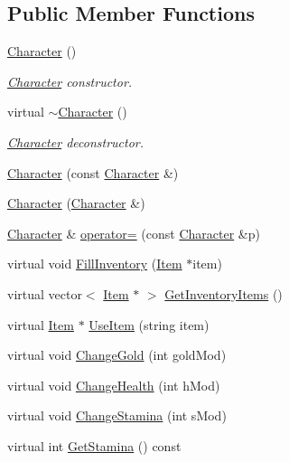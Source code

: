 \subsection*{Public Member Functions}
\begin{DoxyCompactItemize}
\item 
\hyperlink{classCharacter_adc27bdd255876169bad2ed0bae0cffb5}{Character} ()
\begin{DoxyCompactList}\small\item\em \hyperlink{classCharacter}{Character} constructor. \end{DoxyCompactList}\item 
virtual \hyperlink{classCharacter_af3ec409c562122c4464e8a9d3be5f6d2}{$\sim$\-Character} ()
\begin{DoxyCompactList}\small\item\em \hyperlink{classCharacter}{Character} deconstructor. \end{DoxyCompactList}\item 
\hyperlink{classCharacter_a40d65bfcf0422cebc44b2e9b01d8fa2b}{Character} (const \hyperlink{classCharacter}{Character} \&)
\item 
\hyperlink{classCharacter_a01a01e1feb04b92658d35e946ae155bb}{Character} (\hyperlink{classCharacter}{Character} \&)
\item 
\hyperlink{classCharacter}{Character} \& \hyperlink{classCharacter_aa441f0489c055e79c8dfdd813a20c3ad}{operator=} (const \hyperlink{classCharacter}{Character} \&p)
\item 
virtual void \hyperlink{classCharacter_a546635f47f379e4eed59d85d31d85c86}{Fill\-Inventory} (\hyperlink{classItem}{Item} $\ast$item)
\item 
virtual vector$<$ \hyperlink{classItem}{Item} $\ast$ $>$ \hyperlink{classCharacter_a21e35b07fd2bddd94de754f5b8027fcc}{Get\-Inventory\-Items} ()
\item 
virtual \hyperlink{classItem}{Item} $\ast$ \hyperlink{classCharacter_ad13bd70e837024c6f185675d07d28f30}{Use\-Item} (string item)
\item 
virtual void \hyperlink{classCharacter_a5d8e04c875df744a3ea1ca426f8c0e12}{Change\-Gold} (int gold\-Mod)
\item 
virtual void \hyperlink{classCharacter_af0c41714e3a2cb65268fa721846a4939}{Change\-Health} (int h\-Mod)
\item 
virtual void \hyperlink{classCharacter_a50324e5ccb52512dfc69b3775d85c3dc}{Change\-Stamina} (int s\-Mod)
\item 
virtual int \hyperlink{classCharacter_aa443cb1d657be7a60225e02f46210c0d}{Get\-Stamina} () const 

\end{DoxyCompactItemize}
